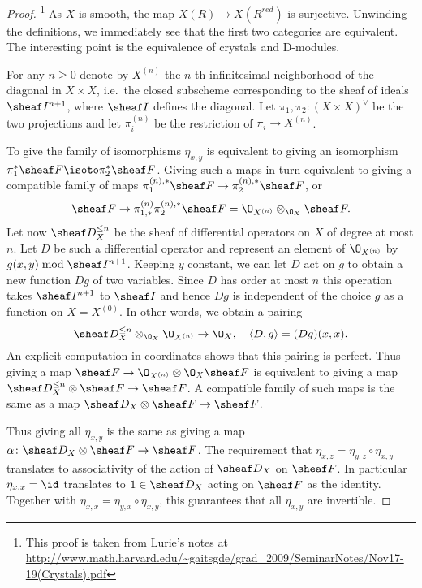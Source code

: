 \documentclass{ck-article}
\begin{document}
\begin{proof}\footnote{This proof is taken from Lurie's notes at \url{http://www.math.harvard.edu/~gaitsgde/grad_2009/SeminarNotes/Nov17-19(Crystals).pdf}}
    As $X$ is smooth, the map $X(R) \to X(R^{red})$ is surjective.
    Unwinding the definitions, we immediately see that the first two categories are equivalent.
    The interesting point is the equivalence of crystals and D-modules.

    For any $n \ge 0$ denote by $X^{(n)}$ the $n$-th infinitesimal  neighborhood of the diagonal in $X \times X$, i.e.~the closed subscheme corresponding to the sheaf of ideals $\sheaf I^{n+1}$, where $\sheaf I$ defines the diagonal.
    Let $\pi_1, \pi_2 \colon (X \times X)^\vee$ be the two projections and let $\pi_i^{(n)}$ be the restriction of $\pi_i \to X^{(n)}$.

    To give the family of isomorphisms $\eta_{x,y}$ is equivalent to giving an isomorphism $\pi_1^*\sheaf F \isoto \pi_2^*\sheaf F$.
    Giving such a maps in turn equivalent to giving a compatible family of maps $\pi_1^{(n),*}\sheaf F \to \pi_2^{(n),*}\sheaf F$, or
    \[
        \sheaf F \to \pi_{1,*}^{(n)}\pi_2^{(n),*}\sheaf F = \O_{X^{(n)}} \otimes_{\O_X} \sheaf F.
    \]
    Let now $\sheaf D_X^{\le n}$ be the sheaf of differential operators on $X$ of degree at most $n$.
    Let $D$ be such a differential operator and represent an element of $\O_{X^{(n)}}$ by $g(x,y) \bmod \sheaf I^{n+1}$.
    Keeping $y$ constant, we can let $D$ act on $g$ to obtain a new function $Dg$ of two variables.
    Since $D$ has order at most $n$ this operation takes $\sheaf I^{n+1}$ to $\sheaf I$ and hence $Dg$ is independent of the choice $g$ as a function on $X = X^{(0)}$.
    In other words, we obtain a pairing
    \[
        \sheaf D_X^{\le n} \otimes_{\O_X} \O_{X^{(n)}} \to \O_X, \quad \langle D, g\rangle = (Dg)(x,x).
    \]
    An explicit computation in coordinates shows that this pairing is perfect.
    Thus giving a map $\sheaf F \to \O_{X^{(n)}} \otimes \O_X \sheaf F$ is equivalent to giving a map $\sheaf D_X^{\le n} \otimes \sheaf F \to \sheaf F$.
    A compatible family of such maps is the same as a map $\sheaf D_X \otimes \sheaf F \to \sheaf F$.

    Thus giving all $\eta_{x,y}$ is the same as giving a map $\alpha\colon\sheaf D_X \otimes \sheaf F \to \sheaf F$.
    The requirement that $\eta_{x,z} = \eta_{y,z} \circ \eta_{x,y}$ translates to associativity of the action of $\sheaf D_X$ on $\sheaf F$.
    In particular $\eta_{x,x} = \id$ translates to $1 \in \sheaf D_X$ acting on $\sheaf F$ as the identity.
    Together with $\eta_{x,x} = \eta_{y,x} \circ \eta_{x,y}$, this guarantees that all $\eta_{x,y}$ are invertible.
\end{proof}
\end{document}

